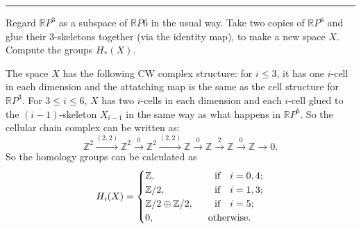 \documentclass[a4paper, 12pt]{article}
\begin{document}
\noindent\rule{7in}{2.8pt}
\begin{problem}{4}
Regard \(\mathbb{R}P^3\) as a subspace of \(\mathbb{R}P6\) in the usual way. Take two copies of \(\mathbb{R}P^6\) and glue their 3-skeletons together (via the identity map), to make 
a new space \(X\). Compute the groups \(H_*(X)\).
\end{problem}
\begin{solution}
The space \(X\) has the following CW complex structure: for \(i\leq 3\), it has one \(i\)-cell in each dimension and the attatching map is the same as the cell structure for \(\mathbb{R}P^3\). For \(3\leq i\leq 6\), \(X\) has two \(i\)-cells 
in each dimension and each \(i\)-cell glued to the \((i-1)\)-skeleton \(X_{i-1}\) in the same way as what happens in \(\mathbb{R}P^6\). So the cellular chain complex can be written as: 
\[\mathbb{Z}^2\xrightarrow{(2,2)}\mathbb{Z}^2\xrightarrow{0}\mathbb{Z}^2\xrightarrow{(2,2)}\mathbb{Z}\xrightarrow{0}\mathbb{Z}\xrightarrow{2}\mathbb{Z}\xrightarrow{0} \mathbb{Z}\rightarrow 0.\]
So the homology groups can be calculated as 
\[H_i(X)=\begin{cases}
	\mathbb{Z},&\ \ \ \ \text{if}\ \ \ i=0,4;\\ 
	\mathbb{Z}/2,&\ \ \ \ \text{if}\ \  \ i=1,3;\\ 
	\mathbb{Z}/2\oplus \mathbb{Z}/2,&\ \ \ \ \text{if}\ \ \ i=5;\\ 
	0,&\ \ \text{otherwise}.
\end{cases}\]
\end{solution}
\end{document}

